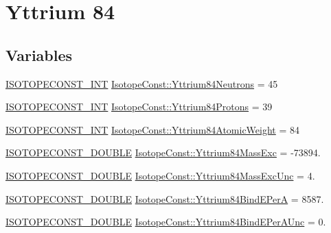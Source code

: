 \hypertarget{group___isotope_const-_yttrium-_y84}{}\section{Yttrium 84}
\label{group___isotope_const-_yttrium-_y84}
\subsection*{Variables}
\begin{DoxyCompactItemize}
\item 
\mbox{\hyperlink{group___isotope_const-_macros_ga5f18360b3e99483a35c32d789e62621c}{I\+S\+O\+T\+O\+P\+E\+C\+O\+N\+S\+T\+\_\+\+I\+NT}} \mbox{\hyperlink{group___isotope_const-_yttrium-_y84_gafd8fc9c7930ae6be9f7268813fbf6ed8}{Isotope\+Const\+::\+Yttrium84\+Neutrons}} = 45
\item 
\mbox{\hyperlink{group___isotope_const-_macros_ga5f18360b3e99483a35c32d789e62621c}{I\+S\+O\+T\+O\+P\+E\+C\+O\+N\+S\+T\+\_\+\+I\+NT}} \mbox{\hyperlink{group___isotope_const-_yttrium-_y84_ga60a4008d903d6eed6cd364cb2a76a45f}{Isotope\+Const\+::\+Yttrium84\+Protons}} = 39
\item 
\mbox{\hyperlink{group___isotope_const-_macros_ga5f18360b3e99483a35c32d789e62621c}{I\+S\+O\+T\+O\+P\+E\+C\+O\+N\+S\+T\+\_\+\+I\+NT}} \mbox{\hyperlink{group___isotope_const-_yttrium-_y84_ga01970aa7b241f6d425c6153eda7467eb}{Isotope\+Const\+::\+Yttrium84\+Atomic\+Weight}} = 84
\item 
\mbox{\hyperlink{group___isotope_const-_macros_ga8f45a7272ce02c0b4c65c44636ed719a}{I\+S\+O\+T\+O\+P\+E\+C\+O\+N\+S\+T\+\_\+\+D\+O\+U\+B\+LE}} \mbox{\hyperlink{group___isotope_const-_yttrium-_y84_ga753272d716ee96b38a3ece1768b82ed3}{Isotope\+Const\+::\+Yttrium84\+Mass\+Exc}} = -\/73894.
\item 
\mbox{\hyperlink{group___isotope_const-_macros_ga8f45a7272ce02c0b4c65c44636ed719a}{I\+S\+O\+T\+O\+P\+E\+C\+O\+N\+S\+T\+\_\+\+D\+O\+U\+B\+LE}} \mbox{\hyperlink{group___isotope_const-_yttrium-_y84_ga765119ab713304c1e692739627ac6bd4}{Isotope\+Const\+::\+Yttrium84\+Mass\+Exc\+Unc}} = 4.
\item 
\mbox{\hyperlink{group___isotope_const-_macros_ga8f45a7272ce02c0b4c65c44636ed719a}{I\+S\+O\+T\+O\+P\+E\+C\+O\+N\+S\+T\+\_\+\+D\+O\+U\+B\+LE}} \mbox{\hyperlink{group___isotope_const-_yttrium-_y84_gad014e50546de984831cdf201af352009}{Isotope\+Const\+::\+Yttrium84\+Bind\+E\+PerA}} = 8587.
\item 
\mbox{\hyperlink{group___isotope_const-_macros_ga8f45a7272ce02c0b4c65c44636ed719a}{I\+S\+O\+T\+O\+P\+E\+C\+O\+N\+S\+T\+\_\+\+D\+O\+U\+B\+LE}} \mbox{\hyperlink{group___isotope_const-_yttrium-_y84_ga6f0f14e5f6c9ca9c578d29fd0008c353}{Isotope\+Const\+::\+Yttrium84\+Bind\+E\+Per\+A\+Unc}} = 0.

\end{DoxyCompactItemize}
